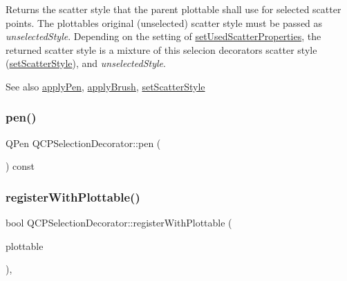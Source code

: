 Returns the scatter style that the parent plottable shall use for selected scatter points. The plottable\textquotesingle{}s original (unselected) scatter style must be passed as {\itshape unselected\+Style}. Depending on the setting of \hyperlink{class_q_c_p_selection_decorator_a808c1607cd4e83869c04986e332455c0}{set\+Used\+Scatter\+Properties}, the returned scatter style is a mixture of this selecion decorator\textquotesingle{}s scatter style (\hyperlink{class_q_c_p_selection_decorator_ab403a613289714ff4fd4a0c0371ab116}{set\+Scatter\+Style}), and {\itshape unselected\+Style}.

\begin{DoxySeeAlso}{See also}
\hyperlink{class_q_c_p_selection_decorator_a75098893f7d08660ea449206810679d7}{apply\+Pen}, \hyperlink{class_q_c_p_selection_decorator_a225544527d51b49546b70d0e6d655a34}{apply\+Brush}, \hyperlink{class_q_c_p_selection_decorator_ab403a613289714ff4fd4a0c0371ab116}{set\+Scatter\+Style} 
\end{DoxySeeAlso}
\mbox{\label{class_q_c_p_selection_decorator_a9307a60c9759223367909aed2d05ad91}} 
\subsubsection{\texorpdfstring{pen()}{pen()}}
{\footnotesize\ttfamily Q\+Pen Q\+C\+P\+Selection\+Decorator\+::pen (\begin{DoxyParamCaption}{ }\end{DoxyParamCaption}) const\hspace{0.3cm}{\ttfamily [inline]}}

\mbox{\label{class_q_c_p_selection_decorator_af66cb39e308da0285ae5d533e1e85027}} 
\subsubsection{\texorpdfstring{register\+With\+Plottable()}{registerWithPlottable()}}
{\footnotesize\ttfamily bool Q\+C\+P\+Selection\+Decorator\+::register\+With\+Plottable (\begin{DoxyParamCaption}\item[{\hyperlink{class_q_c_p_abstract_plottable}{Q\+C\+P\+Abstract\+Plottable} $\ast$}]{plottable }\end{DoxyParamCaption})\hspace{0.3cm}{\ttfamily [protected]}, {\ttfamily [virtual]}}

